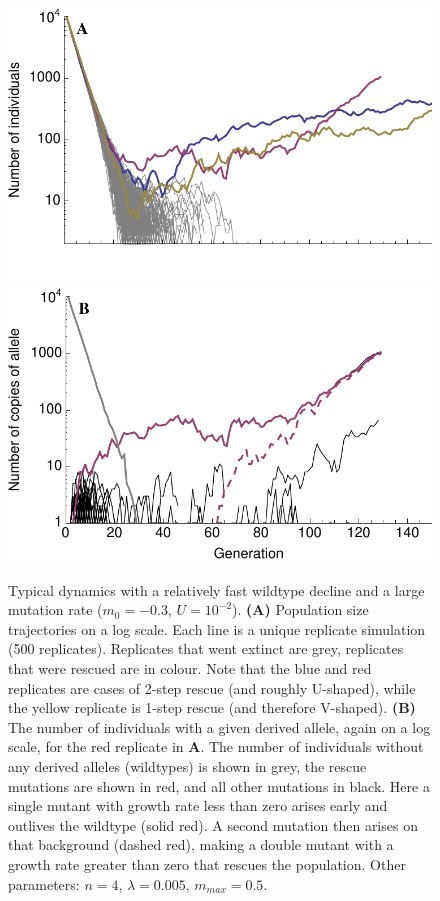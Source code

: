 \documentclass[9pt,twocolumn,twoside,lineno]{gsajnl}
\begin{document}
\begin{figure}[!h]
\centering
\includegraphics[width=\linewidth]{../IMAGES/Ushape.pdf}\\
\includegraphics[width=\linewidth]{../IMAGES/UshapeMutations.pdf}
\caption{
Typical dynamics with a relatively fast wildtype decline and a large mutation rate ($m_0 = -0.3$, $U=10^{-2}$).
\textbf{(A)} Population size trajectories on a log scale.
Each line is a unique replicate simulation (500 replicates).
Replicates that went extinct are grey, replicates that were rescued are in colour.
Note that the blue and red replicates are cases of 2-step rescue (and roughly U-shaped), while the yellow replicate is 1-step rescue (and therefore V-shaped).
\textbf{(B)} The number of individuals with a given derived allele, again on a log scale, for the red replicate in \textbf{A}.
The number of individuals without any derived alleles (wildtypes) is shown in grey, the rescue mutations are shown in red, and all other mutations in black.
Here a single mutant with growth rate less than zero arises early and outlives the wildtype (solid red).
A second mutation then arises on that background (dashed red), making a double mutant with a growth rate greater than zero that rescues the population. 
Other parameters: $n=4$, $\lambda=0.005$, $m_{max}=0.5$.
}%
\label{fig:Ushape}
\end{figure}
\end{document}
